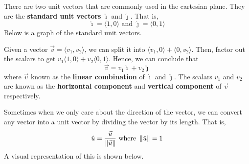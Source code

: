 There are two unit vectors that are commonly used in the cartesian plane. They
are the \textbf{standard unit vectors} $\hat{\imath}$ and $\hat{\jmath}$. That
is, \[\hat{\imath} = \langle 1, 0 \rangle \text{ and } \hat{\jmath} = \langle 0, 1 \rangle\]
Below is a graph of the standard unit vectors.
\begin{center}
\end{center}
Given a vector $\vec{v} = \langle v_1, v_2 \rangle$, we can split it into $\langle v_1, 0 \rangle + \langle 0, v_2 \rangle$. Then, factor out the scalars to get $v_1\langle 1, 0 \rangle + v_2\langle 0, 1 \rangle$. Hence, we can conclude that \[\vec{v} = v_1\hat{\imath} + v_2\hat{\jmath}\] where $\vec{v}$ known as the \textbf{linear combination} of $\hat{\imath}$ and
$\hat{\jmath}$. The scalars $v_1$ and $v_2$ are known as the \textbf{horizontal
    component} and \textbf{vertical component} of $\vec{v}$ respectively.

Sometimes when we only care about the direction of the vector, we can convert
any vector into a unit vector by dividing the vector by its length. That is, \[\hat{u} = \frac{\vec{u}}{\left\lVert\vec{u}\right\rVert} \text{ where } \left\lVert\hat{u}\right\rVert = 1\]
A visual representation of this is shown below.
\begin{center}
\end{center}

